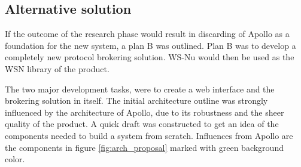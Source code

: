 \begin{table}[ht!]
\centering
{}
\caption{Risk analysis for building the system based on Apollo}
\label{tab:risk_analysis_apollo}
\end{table}

\subsection{Alternative solution}
\label{subsec:prestudies-alternate_solution}

If the outcome of the research phase would result in discarding of Apollo as a foundation for the new system, a plan B was outlined. Plan B was to develop a completely new protocol brokering solution. WS-Nu would then be used as the WSN library of the product. 

The two major development tasks, were to create a web interface and the brokering solution in itself. The initial architecture outline was strongly influenced by the architecture of Apollo, due to its robustness and the sheer quality of the product. A quick draft was constructed to get an idea of the components needed to build a system from scratch. Influences from Apollo are the components in figure \ref{fig:arch_proposal} marked with green background color.

